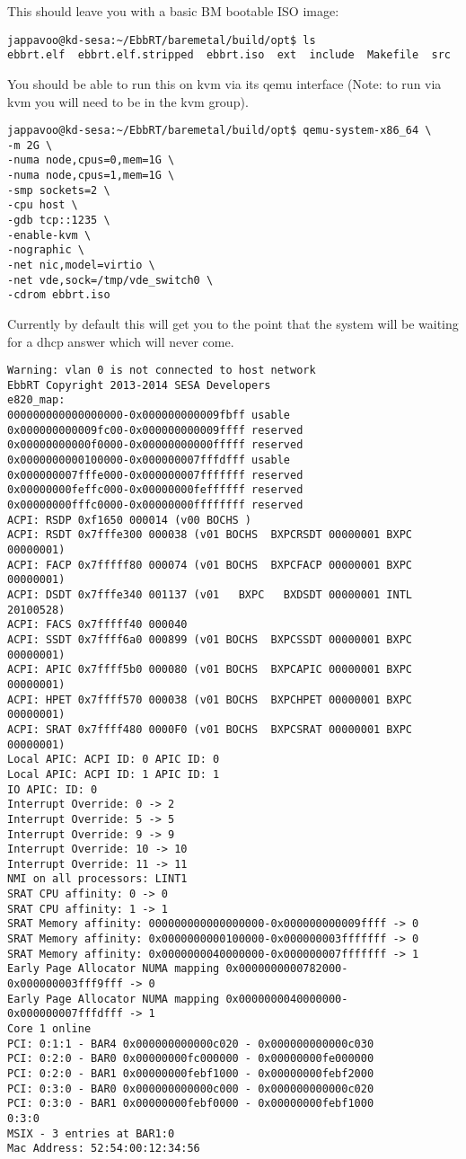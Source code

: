 \documentclass[11pt]{report}
\begin{document}
This should leave you with a basic BM bootable ISO image:
\begin{verbatim}
jappavoo@kd-sesa:~/EbbRT/baremetal/build/opt$ ls
ebbrt.elf  ebbrt.elf.stripped  ebbrt.iso  ext  include  Makefile  src
\end{verbatim}

\newpage
You should be able to run this on kvm via its qemu interface (Note: to run via kvm you will need to be in the kvm group).
\begin{verbatim}
jappavoo@kd-sesa:~/EbbRT/baremetal/build/opt$ qemu-system-x86_64 \
-m 2G \
-numa node,cpus=0,mem=1G \
-numa node,cpus=1,mem=1G \
-smp sockets=2 \
-cpu host \
-gdb tcp::1235 \
-enable-kvm \
-nographic \
-net nic,model=virtio \
-net vde,sock=/tmp/vde_switch0 \
-cdrom ebbrt.iso
\end{verbatim}

Currently by default this will get you to the point
that the system will be waiting for a dhcp answer which will never come.  

{\tiny
\begin{verbatim}
Warning: vlan 0 is not connected to host network
EbbRT Copyright 2013-2014 SESA Developers
e820_map:
000000000000000000-0x000000000009fbff usable
0x000000000009fc00-0x000000000009ffff reserved
0x00000000000f0000-0x00000000000fffff reserved
0x0000000000100000-0x000000007fffdfff usable
0x000000007fffe000-0x000000007fffffff reserved
0x00000000feffc000-0x00000000feffffff reserved
0x00000000fffc0000-0x00000000ffffffff reserved
ACPI: RSDP 0xf1650 000014 (v00 BOCHS )
ACPI: RSDT 0x7fffe300 000038 (v01 BOCHS  BXPCRSDT 00000001 BXPC 00000001)
ACPI: FACP 0x7fffff80 000074 (v01 BOCHS  BXPCFACP 00000001 BXPC 00000001)
ACPI: DSDT 0x7fffe340 001137 (v01   BXPC   BXDSDT 00000001 INTL 20100528)
ACPI: FACS 0x7fffff40 000040
ACPI: SSDT 0x7ffff6a0 000899 (v01 BOCHS  BXPCSSDT 00000001 BXPC 00000001)
ACPI: APIC 0x7ffff5b0 000080 (v01 BOCHS  BXPCAPIC 00000001 BXPC 00000001)
ACPI: HPET 0x7ffff570 000038 (v01 BOCHS  BXPCHPET 00000001 BXPC 00000001)
ACPI: SRAT 0x7ffff480 0000F0 (v01 BOCHS  BXPCSRAT 00000001 BXPC 00000001)
Local APIC: ACPI ID: 0 APIC ID: 0
Local APIC: ACPI ID: 1 APIC ID: 1
IO APIC: ID: 0
Interrupt Override: 0 -> 2
Interrupt Override: 5 -> 5
Interrupt Override: 9 -> 9
Interrupt Override: 10 -> 10
Interrupt Override: 11 -> 11
NMI on all processors: LINT1
SRAT CPU affinity: 0 -> 0
SRAT CPU affinity: 1 -> 1
SRAT Memory affinity: 000000000000000000-0x000000000009ffff -> 0
SRAT Memory affinity: 0x0000000000100000-0x000000003fffffff -> 0
SRAT Memory affinity: 0x0000000040000000-0x000000007fffffff -> 1
Early Page Allocator NUMA mapping 0x0000000000782000-0x000000003fff9fff -> 0
Early Page Allocator NUMA mapping 0x0000000040000000-0x000000007fffdfff -> 1
Core 1 online
PCI: 0:1:1 - BAR4 0x000000000000c020 - 0x000000000000c030
PCI: 0:2:0 - BAR0 0x00000000fc000000 - 0x00000000fe000000
PCI: 0:2:0 - BAR1 0x00000000febf1000 - 0x00000000febf2000
PCI: 0:3:0 - BAR0 0x000000000000c000 - 0x000000000000c020
PCI: 0:3:0 - BAR1 0x00000000febf0000 - 0x00000000febf1000
0:3:0
MSIX - 3 entries at BAR1:0
Mac Address: 52:54:00:12:34:56
\end{verbatim}
}
\end{document}
